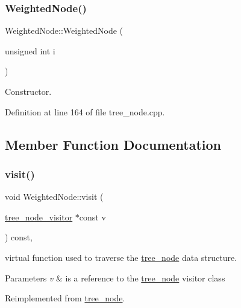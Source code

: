 \subsubsection{\texorpdfstring{Weighted\+Node()}{WeightedNode()}}
{\footnotesize\ttfamily Weighted\+Node\+::\+Weighted\+Node (\begin{DoxyParamCaption}\item[{unsigned int}]{i }\end{DoxyParamCaption})\hspace{0.3cm}{\ttfamily [explicit]}}



Constructor. 



Definition at line 164 of file tree\+\_\+node.\+cpp.



\subsection{Member Function Documentation}
\mbox{\label{structWeightedNode_a6f976feccb640a60f96475a668314fde}} 
\subsubsection{\texorpdfstring{visit()}{visit()}}
{\footnotesize\ttfamily void Weighted\+Node\+::visit (\begin{DoxyParamCaption}\item[{\hyperlink{classtree__node__visitor}{tree\+\_\+node\+\_\+visitor} $\ast$const}]{v }\end{DoxyParamCaption}) const\hspace{0.3cm}{\ttfamily [override]}, {\ttfamily [virtual]}}



virtual function used to traverse the \hyperlink{classtree__node}{tree\+\_\+node} data structure. 


\begin{DoxyParams}{Parameters}
{\em v} & is a reference to the \hyperlink{classtree__node}{tree\+\_\+node} visitor class \\
\hline
\end{DoxyParams}


Reimplemented from \hyperlink{classtree__node_aa9abba3f1b30e0be80b4a56b188c6ecc}{tree\+\_\+node}.




